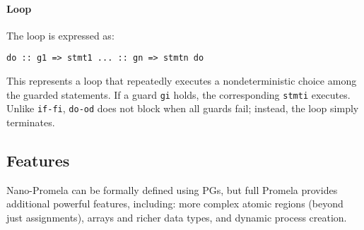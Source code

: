\paragraph*{Loop}
The loop is expressed as: 
\begin{verbatim}
do :: g1 => stmt1 ... :: gn => stmtn do
\end{verbatim}
This represents a loop that repeatedly executes a nondeterministic choice among the guarded statements.
If a guard \texttt{gi} holds, the corresponding \texttt{stmti} executes.
Unlike \texttt{if-fi}, \texttt{do-od} does not block when all guards fail; instead, the loop simply terminates.

\subsection{Features}
Nano-Promela can be formally defined using PGs, but full Promela provides additional powerful features, including: more complex atomic regions (beyond just assignments), arrays and richer data types, and dynamic process creation.